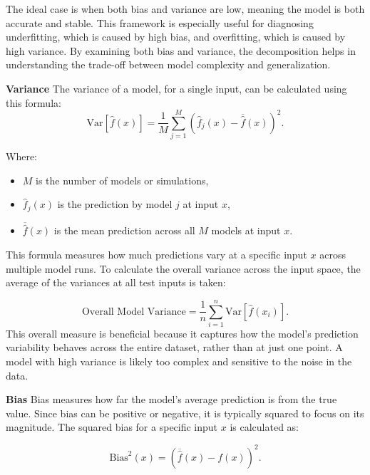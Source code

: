 The ideal case is when both bias and variance are low, meaning the model is both accurate and stable. This framework is especially useful for diagnosing underfitting, which is caused by high bias, and overfitting, which is caused by high variance. By examining both bias and variance, the decomposition helps in understanding the trade-off between model complexity and generalization.\newline

\noindent \textbf{Variance} \newline
\noindent The variance of a model, for a single input, can be calculated using this formula:
\begin{equation}
\text{Var}[\hat{f}(x)] = \frac{1}{M} \sum_{j=1}^{M} (\hat{f}_j(x) - \overline{\hat{f}}(x))^{2}.
\end{equation}

Where:
\begin{itemize}
	\item $M$ is the number of models or simulations,
	\item $\hat{f}_j(x)$ is the prediction by model $j$ at input $x$,
	\item $\overline{\hat{f}}(x)$ is the mean prediction across all $M$ models at input $x$.
\end{itemize}

This formula measures how much predictions vary at a specific input $x$ across multiple model runs. To calculate the overall variance across the input space, the average of the variances at all test inputs is taken:

\begin{equation}
\text{Overall Model Variance} = \frac{1}{n} \sum_{i=1}^{n} \text{Var}[\hat{f}(x_i)].
\end{equation}
This overall measure is beneficial because it captures how the model’s prediction variability behaves across the entire dataset, rather than at just one point. A model with high variance is likely too complex and sensitive to the noise in the data.\newline

\noindent \textbf{Bias}\newline
\noindent Bias measures how far the model’s average prediction is from the true value. Since bias can be positive or negative, it is typically squared to focus on its magnitude. The squared bias for a specific input $x$ is calculated as:

\begin{equation}
\text{Bias}^2(x) = (\overline{\hat{f}}(x) - f(x))^{2}.
\end{equation}

